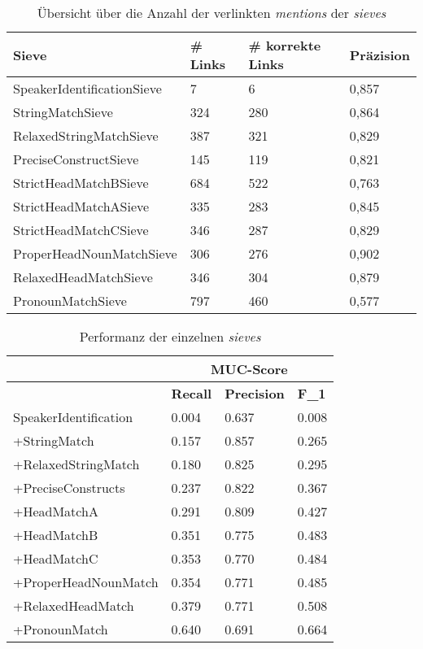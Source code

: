 \documentclass{scrartcl}
\begin{document}
\begin{table}[h]
\begin{tabular}{l||l|l|l}
\textbf{Sieve} & \textbf{\# Links} & \textbf{\# korrekte Links} & \textbf{Präzision} \\\hline
SpeakerIdentificationSieve & 7 & 6 & 0,857 \\
StringMatchSieve & 324 & 280 & 0,864\\
RelaxedStringMatchSieve & 387 & 321 & 0,829 \\
PreciseConstructSieve & 145 & 119 & 0,821 \\
StrictHeadMatchBSieve & 684 & 522 & 0,763 \\
StrictHeadMatchASieve & 335 & 283 & 0,845 \\
StrictHeadMatchCSieve & 346 & 287 & 0,829 \\
ProperHeadNounMatchSieve & 306 & 276 & 0,902 \\
RelaxedHeadMatchSieve & 346 & 304 & 0,879 \\
PronounMatchSieve & 797 & 460 & 0,577
\end{tabular}
\caption{Übersicht über die Anzahl der verlinkten \textit{mentions} der \textit{sieves}}
\label{tab:links}
\end{table}

\begin{table}[h]
\begin{tabular}{l||ll|l}
& \multicolumn{3}{c}{\textbf{MUC-Score}} \\ \hline
	                 & \textbf{Recall} & \textbf{Precision} & \textbf{F\_1} \\ \hline
SpeakerIdentification & 0.004  & 0.637     & 0.008    \\ 
+StringMatch          & 0.157  & 0.857     & 0.265    \\ 
+RelaxedStringMatch   & 0.180  & 0.825     & 0.295    \\ 
+PreciseConstructs    & 0.237  & 0.822     & 0.367    \\ 
+HeadMatchA           & 0.291  & 0.809     & 0.427    \\ 
+HeadMatchB           & 0.351  & 0.775     & 0.483    \\ 
+HeadMatchC           & 0.353  & 0.770     & 0.484    \\ 
+ProperHeadNounMatch  & 0.354  & 0.771     & 0.485    \\ 
+RelaxedHeadMatch     & 0.379  & 0.771     & 0.508    \\ 
+PronounMatch         & 0.640  & 0.691     & 0.664    \\ 
\end{tabular}
\caption{Performanz der einzelnen \textit{sieves}}
\label{tab:sieve_performanz}
\end{table}
\end{document}
